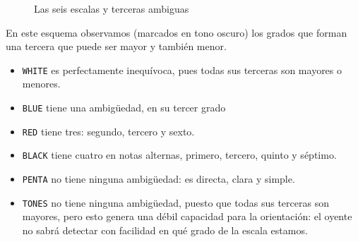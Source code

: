 \documentclass[]{article}
\providecommand{\tightlist}{%
  \setlength{
\itemsep}{0pt}\setlength{\parskip}{0pt}}
\begin{document}
\begin{figure}
\begin{subfigure}{0.15\textwidth}
\begin{tikzpicture}
    \end{tikzpicture}    \caption{}
    \label{fig:tikz2}
  \end{subfigure}
  \hfill
  \begin{subfigure}{0.15\textwidth}
    \centering
        \caption{}
    \label{fig:tikz2}
  \end{subfigure}
  \hfill
  \caption{Las seis escalas y terceras ambiguas}
  \label{fig:the-six-scales-and-ambiguous-thirds}
\end{figure}



En este esquema observamos (marcados en tono oscuro) los grados que forman una tercera que puede ser mayor y también menor.

\begin{itemize}   \tightlist
  \item  \texttt{WHITE} es perfectamente inequívoca, pues todas sus terceras         son mayores o menores.
  \item  \texttt{BLUE} tiene una ambigüedad, en su tercer grado
  \item  \texttt{RED} tiene tres: segundo, tercero y sexto.
  \item  \texttt{BLACK} tiene cuatro en notas alternas, primero, tercero,         quinto y séptimo.
  \item  \texttt{PENTA} no tiene ninguna ambigüedad: es directa, clara y         simple.
  \item  \texttt{TONES} no tiene ninguna ambigüedad, puesto que todas sus         terceras son mayores, pero esto genera una débil capacidad para la         orientación: el oyente no sabrá detectar con facilidad en qué grado de         la escala estamos.
\end{itemize}
\end{document}
